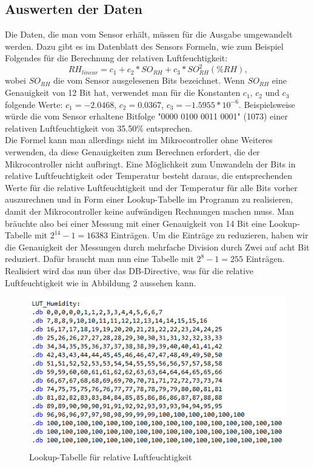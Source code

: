 \documentclass[]{article}
\begin{document}
\subsection{Auswerten der Daten}
Die Daten, die man vom Sensor erhält, müssen für die Ausgabe umgewandelt werden. Dazu gibt es im Datenblatt des Sensors Formeln, wie zum Beispiel Folgendes für die Berechnung der relativen Luftfeuchtigkeit:
\begin{equation*}
RH_{linear} = c_1 + c_2*SO_{RH} + c_3*SO_{RH}^{2} \left(\%RH\right)\textbf{,}
\end{equation*}
wobei $SO_{RH}$ die vom Sensor ausgelesenen Bits bezeichnet. Wenn $SO_{RH}$ eine Genauigkeit von 12 Bit hat, verwendet man für die Konstanten $c_1$, $c_2$ und $c_3$ folgende Werte: $c_1 = -2.0468$, $c_2 = 0.0367$, $c_3 = -1.5955*10^{-6}$.
Beispielsweise würde die vom Sensor erhaltene Bitfolge "0000 0100 0011 0001" (1073) einer relativen Luftfeuchtigkeit von 35.50\% entsprechen.\\
Die Formel kann man allerdings nicht im Mikrocontroller ohne Weiteres verwenden, da diese Genauigkeiten zum Berechnen erfordert, die der Mikrocontroller nicht aufbringt. Eine Möglichkeit zum Umwandeln der Bits in relative Luftfeuchtigkeit oder Temperatur besteht daraus, die entsprechenden Werte für die relative Luftfeuchtigkeit und der Temperatur für alle Bits vorher auszurechnen und in Form einer Lookup-Tabelle im Programm zu realisieren, damit der Mikrocontroller keine aufwändigen Rechnungen machen muss. Man bräuchte also bei einer Messung mit einer Genauigkeit von 14 Bit eine Lookup-Tabelle mit $2^{14}-1 = 16383$ Einträgen. Um die Einträge zu reduzieren, haben wir die Genauigkeit der Messungen durch mehrfache Division durch Zwei auf acht Bit reduziert. Dafür braucht man nun eine Tabelle mit $2^8-1 = 255$ Einträgen. Realisiert wird das nun über das DB-Directive, was für die relative Luftfeuchtigkeit wie in Abbildung 2 aussehen kann.
\begin{figure}[h]
	\centering
	\includegraphics[width=0.7\columnwidth]{LUT.png}
	\caption{Lookup-Tabelle für relative Luftfeuchtigkeit}
\end{figure}
\end{document}
